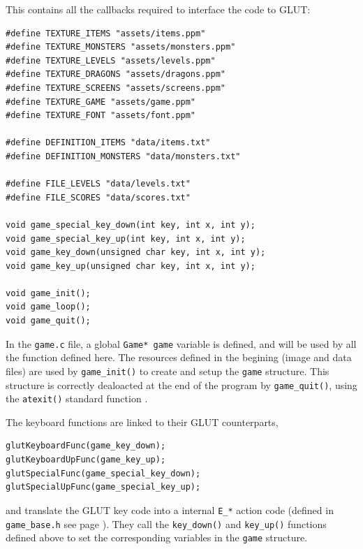 \documentclass[12pt,a4paper]{article}
\newcommand{\cc}[1]{\texttt{#1}}
\begin{document}
This contains all the callbacks required to interface the code to GLUT:\begin{verbatim}
#define TEXTURE_ITEMS "assets/items.ppm"
#define TEXTURE_MONSTERS "assets/monsters.ppm"
#define TEXTURE_LEVELS "assets/levels.ppm"
#define TEXTURE_DRAGONS "assets/dragons.ppm"
#define TEXTURE_SCREENS "assets/screens.ppm"
#define TEXTURE_GAME "assets/game.ppm"
#define TEXTURE_FONT "assets/font.ppm"

#define DEFINITION_ITEMS "data/items.txt"
#define DEFINITION_MONSTERS "data/monsters.txt"

#define FILE_LEVELS "data/levels.txt"
#define FILE_SCORES "data/scores.txt"

void game_special_key_down(int key, int x, int y);
void game_special_key_up(int key, int x, int y);
void game_key_down(unsigned char key, int x, int y);
void game_key_up(unsigned char key, int x, int y);

void game_init();
void game_loop();
void game_quit();
\end{verbatim}

In the \cc{game.c} file, a global \cc{Game* game} variable is defined, and will be used by all the function defined here. The resources defined in the begining (image and data files) are used by \cc{game_init()} to create and setup the \cc{game} structure. This structure is correctly dealoacted at the end of the program by \cc{game_quit()}, using the \cc{atexit()} standard function \cite{cppref}.

The keyboard functions are linked to their GLUT counterparts, \begin{verbatim}
glutKeyboardFunc(game_key_down);
glutKeyboardUpFunc(game_key_up);
glutSpecialFunc(game_special_key_down);
glutSpecialUpFunc(game_special_key_up);
\end{verbatim}
and translate the GLUT key code into a internal \cc{E_*} action code (defined in \texttt{game\_base.h} see page \pageref{p:ekey}). They call the \cc{key_down()} and \cc{key_up()} functions defined above to set the corresponding variables in the \cc{game} structure.
\end{document}
